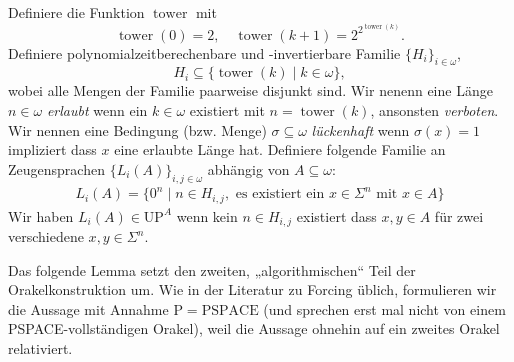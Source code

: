 \documentclass[nofonts]{uebung}
\theoremstyle{definition}
\def\P{\ensuremath{\mathrm{P}}}
\def\UP{\ensuremath{\mathrm{UP}}}
\def\PSPACE{\ensuremath{\mathrm{PSPACE}}}
\DeclareMathOperator{\tower}{tower}
\begin{document}
Definiere die Funktion $\tower$ mit \[ \tower(0)=2, \quad \tower(k+1)=2^{2^{\tower(k)}}. \]
Definiere polynomialzeitberechenbare und -invertierbare Familie $\{H_{i}\}_{i\in\omega}$, \[ H_i\subseteq\{ \tower(k) \mid k\in\omega \}, \]wobei
alle Mengen der Familie paarweise disjunkt sind.
Wir nenenn eine Länge $n\in\omega$ \emph{erlaubt} wenn ein $k\in\omega$ existiert mit $n=\tower(k)$, ansonsten \emph{verboten}.
Wir nennen eine Bedingung (bzw. Menge) $\sigma\subseteq \omega$ \emph{lückenhaft} wenn $\sigma(x)=1$ impliziert dass $x$ eine erlaubte Länge hat.
Definiere folgende Familie an Zeugensprachen $\{L_{i}(A) \}_{i,j\in\omega}$ abhängig von $A\subseteq\omega$:
\begin{gather*}
    L_{i}(A) = \{ 0^n \mid n\in H_{i,j}, \text{ es existiert ein $x\in\Sigma^n$ mit $x\in A$} \}
\end{gather*}
Wir haben $L_{i}(A)\in\UP^A$ wenn kein $n\in H_{i,j}$ existiert dass $x, y\in A$ für zwei verschiedene $x,y\in\Sigma^n$.

Das folgende Lemma setzt den zweiten, „algorithmischen“ Teil der Orakelkonstruktion um. Wie in der Literatur zu Forcing üblich, formulieren wir die Aussage mit Annahme $\P=\PSPACE$ (und sprechen erst mal nicht von einem PSPACE-vollständigen Orakel), weil die Aussage ohnehin auf ein zweites Orakel relativiert.
\end{document}
